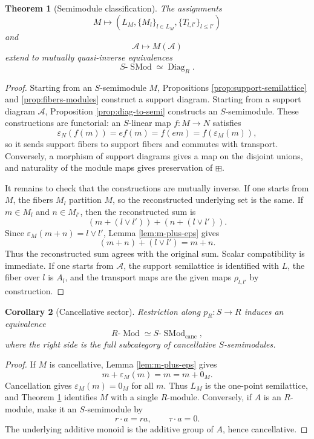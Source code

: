 \documentclass[11pt]{article}
\newcommand{\eps}{\varepsilon}
\theoremstyle{plain}
\newtheorem{theorem}{Theorem}[section]
\newtheorem{corollary}[theorem]{Corollary}
\theoremstyle{definition}
\begin{document}
\begin{theorem}[Semimodule classification]\label{thm:semimodule-classification}
The assignments
\[
   M\longmapsto (L_M,\{M_l\}_{l\in L_M},\{T_{l,l'}\}_{l\le l'})
\]
and
\[
   \mathcal A\longmapsto M(\mathcal A)
\]
extend to mutually quasi-inverse equivalences
\[
   S\text{-}\operatorname{SMod}\simeq \operatorname{Diag}_R.
\]
\end{theorem}

\begin{proof}
Starting from an \(S\)-semimodule \(M\), Propositions \ref{prop:support-semilattice} and \ref{prop:fibers-modules} construct a support diagram.  Starting from a support diagram \(\mathcal A\), Proposition \ref{prop:diag-to-semi} constructs an \(S\)-semimodule.  These constructions are functorial: an \(S\)-linear map \(f:M\to N\) satisfies
\[
   \eps_N(f(m))=ef(m)=f(em)=f(\eps_M(m)),
\]
so it sends support fibers to support fibers and commutes with transport.  Conversely, a morphism of support diagrams gives a map on the disjoint unions, and naturality of the module maps gives preservation of \(\boxplus\).

It remains to check that the constructions are mutually inverse.  If one starts from \(M\), the fibers \(M_l\) partition \(M\), so the reconstructed underlying set is the same.  If \(m\in M_l\) and \(n\in M_{l'}\), then the reconstructed sum is
\[
   (m+(l\vee l'))+(n+(l\vee l')).
\]
Since \(\eps_M(m+n)=l\vee l'\), Lemma \ref{lem:m-plus-eps} gives
\[
   (m+n)+(l\vee l')=m+n.
\]
Thus the reconstructed sum agrees with the original sum.  Scalar compatibility is immediate.  If one starts from \(\mathcal A\), the support semilattice is identified with \(L\), the fiber over \(l\) is \(A_l\), and the transport maps are the given maps \(\rho_{l,l'}\) by construction.
\end{proof}

\begin{corollary}[Cancellative sector]\label{cor:cancellative}
Restriction along \(p_R:S\to R\) induces an equivalence
\[
   R\text{-}\operatorname{Mod}\simeq S\text{-}\operatorname{SMod}_{\operatorname{canc}},
\]
where the right side is the full subcategory of cancellative \(S\)-semimodules.
\end{corollary}

\begin{proof}
If \(M\) is cancellative, Lemma \ref{lem:m-plus-eps} gives
\[
   m+\eps_M(m)=m=m+0_M.
\]
Cancellation gives \(\eps_M(m)=0_M\) for all \(m\).  Thus \(L_M\) is the one-point semilattice, and Theorem \ref{thm:semimodule-classification} identifies \(M\) with a single \(R\)-module.  Conversely, if \(A\) is an \(R\)-module, make it an \(S\)-semimodule by
\[
   r\cdot a=ra,
   \qquad
   \tau\cdot a=0.
\]
The underlying additive monoid is the additive group of \(A\), hence cancellative.
\end{proof}
\end{document}
